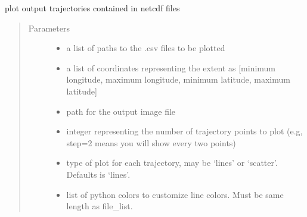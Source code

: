 \documentclass[letterpaper,10pt,english]{sphinxmanual}
\begin{document}
\begin{fulllineitems}
\label{\detokenize{octapy:octapy.tools.plot_netcdf_output}}
\sphinxAtStartPar
plot output trajectories contained in netcdf files
\begin{quote}\begin{description}
\item[{Parameters}] \leavevmode\begin{itemize}
\item {} 
\sphinxAtStartPar
{} \textendash{} a list of paths to the .csv files to be plotted

\item {} 
\sphinxAtStartPar
{} \textendash{} a list of coordinates representing the extent as {[}minimum longitude,
maximum longitude, minimum latitude, maximum latitude{]}

\item {} 
\sphinxAtStartPar
{} \textendash{} path for the output image file

\item {} 
\sphinxAtStartPar
{} \textendash{} integer representing the number of trajectory points to plot (e.g,
step=2 means you will show every two points)

\item {} 
\sphinxAtStartPar
{} \textendash{} type of plot for each trajectory, may be ‘lines’ or ‘scatter’.
Defaults is ‘lines’.

\item {} 
\sphinxAtStartPar
{} \textendash{} list of python colors to customize line colors. Must be same length as
file\_list.


\end{itemize}
\end{description}
\end{quote}
\end{fulllineitems}
\end{document}
